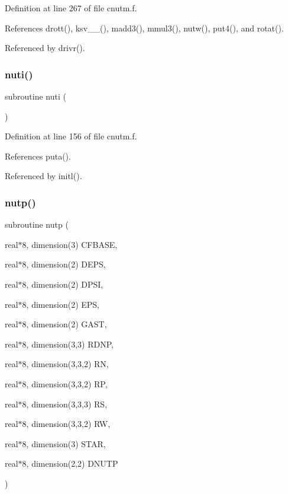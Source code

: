 Definition at line 267 of file cnutm.\+f.



References drott(), ksv\+\_\+\_(), madd3(), mmul3(), nutw(), put4(), and rotat().



Referenced by drivr().

\mbox{\label{cnutm_8f_a7b8f108b2d99de06a08f43b860fd02d7}} 
\subsubsection{\texorpdfstring{nuti()}{nuti()}}
{\footnotesize\ttfamily subroutine nuti (\begin{DoxyParamCaption}{ }\end{DoxyParamCaption})}



Definition at line 156 of file cnutm.\+f.



References puta().



Referenced by initl().

\mbox{\label{cnutm_8f_a97cf6a635caca92a8f2a0dd0f21c59b2}} 
\subsubsection{\texorpdfstring{nutp()}{nutp()}}
{\footnotesize\ttfamily subroutine nutp (\begin{DoxyParamCaption}\item[{real$\ast$8, dimension(3)}]{C\+F\+B\+A\+SE,  }\item[{real$\ast$8, dimension(2)}]{D\+E\+PS,  }\item[{real$\ast$8, dimension(2)}]{D\+P\+SI,  }\item[{real$\ast$8, dimension(2)}]{E\+PS,  }\item[{real$\ast$8, dimension(2)}]{G\+A\+ST,  }\item[{real$\ast$8, dimension(3,3)}]{R\+D\+NP,  }\item[{real$\ast$8, dimension(3,3,2)}]{RN,  }\item[{real$\ast$8, dimension(3,3,2)}]{RP,  }\item[{real$\ast$8, dimension(3,3,3)}]{RS,  }\item[{real$\ast$8, dimension(3,3,2)}]{RW,  }\item[{real$\ast$8, dimension(3)}]{S\+T\+AR,  }\item[{real$\ast$8, dimension(2,2)}]{D\+N\+U\+TP }\end{DoxyParamCaption})}



